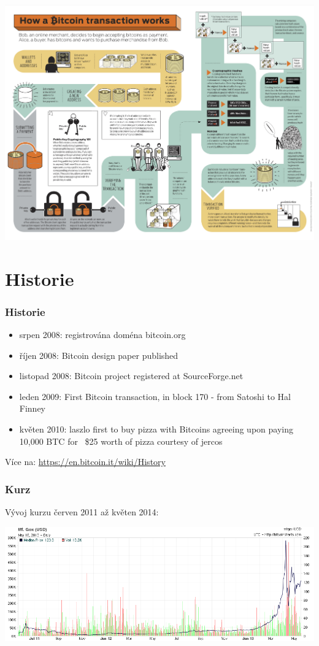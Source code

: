 \documentclass[xetex]{beamer}
\begin{document}
\begin{frame}
	\includegraphics[scale=0.37]{images/how-a-bitcoin-transaction-works.jpg}
\end{frame}

\section{Historie}

\begin{frame}
  \frametitle{Historie}
	\begin{itemize}
		\item srpen 2008: registrována doména bitcoin.org 
		\item říjen 2008: Bitcoin design paper published 
		\item listopad 2008: Bitcoin project registered at SourceForge.net 
		\item leden 2009: First Bitcoin transaction, in block 170 - from Satoshi to Hal Finney
		\item květen 2010: laszlo first to buy pizza with Bitcoins agreeing upon paying 10,000 BTC for ~\$25 worth of pizza courtesy of jercos
	\end{itemize}

	Více na: \url{https://en.bitcoin.it/wiki/History}
\end{frame}

\begin{frame}
	\frametitle{Kurz}
	Vývoj kurzu červen 2011 až květen 2014:
	
	\includegraphics[scale=0.35]{images/bitcoin-exchange-rate.png}
	
\end{frame}
\end{document}
